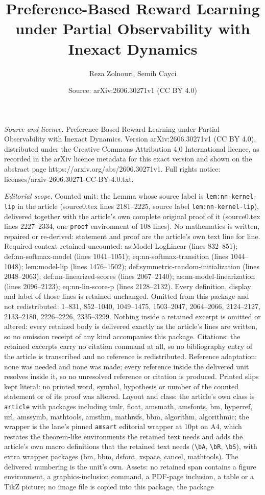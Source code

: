 \documentclass[10pt,a4paper]{amsart}
\title[Preference-Based Reward Learning under Partial Observability]{Preference-Based Reward Learning under Partial Observability with Inexact Dynamics}
\author{Reza Zolnouri, Semih Cayci}
\date{Source: arXiv:2606.30271v1 (CC BY 4.0)}
\begin{document}
\maketitle

\noindent\emph{Source and licence.} Preference-Based Reward Learning under Partial Observability with Inexact Dynamics. Version arXiv:2606.30271v1 (CC BY 4.0), distributed under the Creative Commons Attribution 4.0 International licence, as recorded in the arXiv licence metadata for this exact version and shown on the abstract page https://arxiv.org/abs/2606.30271v1. Full rights notice: licenses/arxiv-2606.30271-CC-BY-4.0.txt.\par\smallskip

\noindent\textit{Editorial scope.} Counted unit: the Lemma whose source label is \texttt{lem:nn-kernel-lip} in the article (source0.tex lines 2181--2225, source label \texttt{lem:nn-kernel-lip}), delivered together with the article's own complete original proof of it (source0.tex lines 2227--2334, one \texttt{proof} environment of 108 lines). No mathematics is written, repaired or re-derived: statement and proof are the article's own text line for line. Required context retained uncounted: as:Model-LogLinear (lines 832--851); def:nn-softmax-model (lines 1041--1051); eq:nn-softmax-transition (lines 1044--1048); lem:model-lip (lines 1476--1502); def:symmetric-random-initialization (lines 2048--2063); def:nn-linearized-scores (lines 2067--2140); as:nn-model-linearization (lines 2096--2123); eq:nn-lin-score-p (lines 2128--2132). Every definition, display and label of those lines is retained unchanged. Omitted from this package and not redistributed: 1--831, 852--1040, 1049--1475, 1503--2047, 2064--2066, 2124--2127, 2133--2180, 2226--2226, 2335--3299. Nothing inside a retained excerpt is omitted or altered: every retained body is delivered exactly as the article's lines are written, so no omission receipt of any kind accompanies this package. Citations: the retained excerpts carry no citation command at all, so no bibliography entry of the article is transcribed and no reference is redistributed. Reference adaptation: none was needed and none was made; every reference inside the delivered unit resolves inside it, so no unresolved reference or citation is produced. Printed slips kept literal: no printed word, symbol, hypothesis or number of the counted statement or of its proof was altered. Layout and class: the article's own class is \texttt{article} with packages including tmlr, float, amsmath, amsfonts, bm, hyperref, url, amssymb, mathtools, amsthm, mathrsfs, bbm, algorithm, algorithmic; the wrapper is the lane's pinned \texttt{amsart} editorial wrapper at 10pt on A4, which restates the theorem-like environments the retained text needs and adds the article's own macro definitions that the retained text needs (\texttt{\textbackslash bA}, \texttt{\textbackslash bR}, \texttt{\textbackslash bS}), with extra wrapper packages (bm, bbm, dsfont, xspace, cancel, mathtools). The delivered numbering is the unit's own. Assets: no retained span contains a figure environment, a graphics-inclusion command, a PDF-page inclusion, a table or a TikZ picture; no image file is copied into this package, the package 
\end{document}
